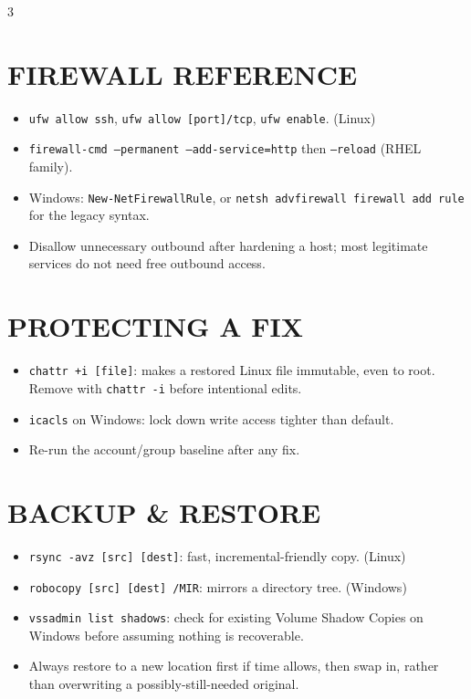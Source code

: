\documentclass[7pt,landscape]{article}
\begin{document}
\begin{multicols*}{3}
\section{FIREWALL REFERENCE}
\begin{itemize}
    \item \texttt{ufw allow ssh}, \texttt{ufw allow [port]/tcp}, \texttt{ufw enable}. \textcolor{linuxc}{(Linux)}
    \item \texttt{firewall-cmd --permanent --add-service=http} then \texttt{--reload} \textcolor{linuxc}{(RHEL family)}.
    \item \textcolor{winc}{Windows}: \texttt{New-NetFirewallRule}, or \texttt{netsh advfirewall firewall add rule} for the legacy syntax.
    \item Disallow unnecessary outbound after hardening a host; most legitimate services do not need free outbound access.
\end{itemize}

\section{PROTECTING A FIX}
\begin{itemize}
    \item \texttt{chattr +i [file]}: makes a restored \textcolor{linuxc}{Linux} file immutable, even to root. Remove with \texttt{chattr -i} before intentional edits.
    \item \texttt{icacls} on \textcolor{winc}{Windows}: lock down write access tighter than default.
    \item Re-run the account/group baseline after any fix.
\end{itemize}

\section{BACKUP \& RESTORE}
\begin{itemize}
    \item \texttt{rsync -avz [src] [dest]}: fast, incremental-friendly copy. \textcolor{linuxc}{(Linux)}
    \item \texttt{robocopy [src] [dest] /MIR}: mirrors a directory tree. \textcolor{winc}{(Windows)}
    \item \texttt{vssadmin list shadows}: check for existing Volume Shadow Copies on \textcolor{winc}{Windows} before assuming nothing is recoverable.
    \item Always restore to a new location first if time allows, then swap in, rather than overwriting a possibly-still-needed original.
\end{itemize}


\end{multicols*}
\end{document}

